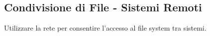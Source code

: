 \subsection{ Condivisione di File - Sistemi Remoti}

Utilizzare la rete per consentire l'accesso al file system tra sistemi.










